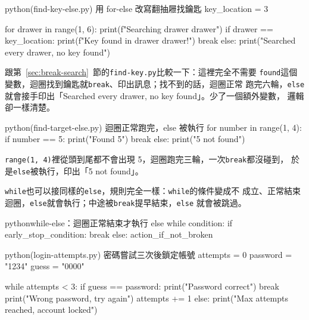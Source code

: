 \begin{example}{python}{(find-key-else.py) 用 for-else 改寫翻抽屜找鑰匙}
key_location = 3

for drawer in range(1, 6):
    print(f"Searching drawer {drawer}")
    if drawer == key_location:
        print(f"Key found in drawer {drawer}!")
        break
else:
    print("Searched every drawer, no key found")
\end{example}


跟第~\ref{sec:break-search}~節的\texttt{find-key.py}比較一下：這裡完全不需要
\texttt{found}這個變數，迴圈找到鑰匙就\texttt{break}、印出訊息；找不到的話，迴圈正常
跑完六輪，\texttt{else}就會接手印出「Searched every drawer, no key found」。少了一個額外變數，
邏輯卻一樣清楚。

\begin{example}{python}{(find-target-else.py) 迴圈正常跑完，else 被執行}
for number in range(1, 4):
    if number == 5:
        print("Found 5")
        break
else:
    print("5 not found")
\end{example}


\texttt{range(1, 4)}裡從頭到尾都不會出現 5，迴圈跑完三輪，一次\texttt{break}都沒碰到，
於是\texttt{else}被執行，印出「5 not found」。


\texttt{while}也可以接同樣的\texttt{else}，規則完全一樣：\texttt{while}的條件變成不
成立、正常結束迴圈，\texttt{else}就會執行；中途被\texttt{break}提早結束，\texttt{else}
就會被跳過。

\begin{code}{python}{while-else：迴圈正常結束才執行 else}
while condition:
    if early_stop_condition:
        break
else:
    action_if_not_broken
\end{code}

\begin{example}{python}{(login-attempts.py) 密碼嘗試三次後鎖定帳號}
attempts = 0
password = "1234"
guess = "0000"

while attempts < 3:
    if guess == password:
        print("Password correct")
        break
    print("Wrong password, try again")
    attempts += 1
else:
    print("Max attempts reached, account locked")
\end{example}

